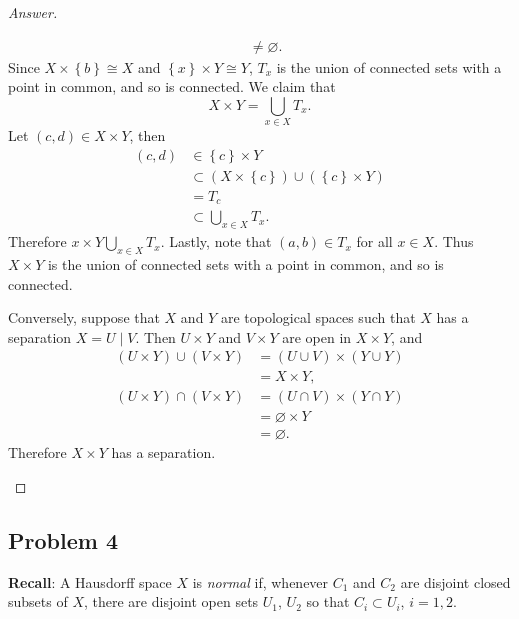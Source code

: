 \documentclass[12pt]{article}
\newcommand{\ita}[1]{\textit{#1}}
\newcommand\paren[1]{\left( #1 \right)}
\newcommand\setb[1]{\left \{ #1 \right \}}
\theoremstyle{definition}
\begin{document}
\begin{proof}[Answer]
\begin{enumerate}[(a)]
\begin{align*}
            & \neq \varnothing.
        \end{align*}
        Since $X \times \setb{ b } \cong X$ and $\setb{ x } \times Y \cong Y$, $T_x$ is the union of connected sets with a point in common, and so is connected. We claim that 
        \[
            X \times Y = \bigcup\limits_{x \in X} T_x.
        \]
        Let $(c,d) \in X \times Y$, then 
        \begin{align*}
            (c,d) & \in \setb{ c } \times Y \\
            & \subset \paren{ X \times \setb{ c } } \cup \paren{ \setb{ c } \times Y } \\
            & = T_c \\
            & \subset \bigcup\limits_{x \in X} T_x.
        \end{align*}
        Therefore $x \times Y \bigcup\limits_{x \in X} T_x$. Lastly, note that $(a,b) \in T_x$ for all $x \in X$. Thus $X \times Y$ is the union of connected sets with a point in common, and so is connected.
        
        Conversely, suppose that $X$ and $Y$ are topological spaces such that $X$ has a separation $X = U \mid V$. Then $U \times Y$ and $V \times Y$ are open in $X \times Y$, and 
        \begin{align*}
            \paren{ U \times Y } \cup \paren{ V \times Y } & = \paren{ U \cup V } \times \paren{ Y \cup Y } \\
            & = X \times Y, \\
            \paren{ U \times Y } \cap \paren{ V \times Y } & = \paren{ U \cap V } \times \paren{ Y \cap Y } \\
            & = \varnothing \times Y \\
            & = \varnothing.
        \end{align*}
        Therefore $X \times Y$ has a separation.
    \end{enumerate}
\end{proof}
\subsection{Problem 4 \texorpdfstring{\cite{Munkres}}{}}
\noindent
\textbf{Recall}: A Hausdorff space $X$ is \ita{normal} if, whenever $C_1$ and $C_2$ are disjoint closed subsets of $X$, there are disjoint open sets $U_1$, $U_2$ so that $C_i \subset U_i$, $i = 1,2$.
\end{document}
